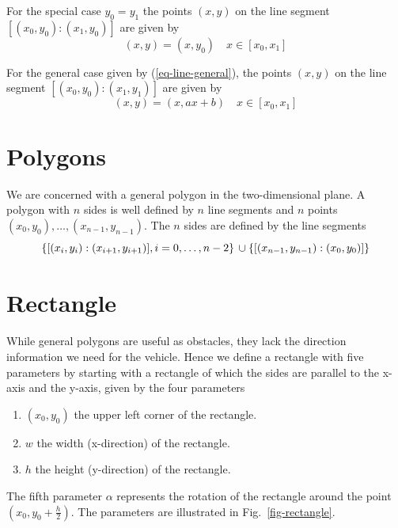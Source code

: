 \documentclass[11pt]{article}
\newcommand{\eqn}[1]{(\ref{#1})}
\newcommand{\figref}[1]{Fig.~\eqref{#1}}
\begin{document}
For the special case $y_0 = y_1$ the points $(x, y)$ on the line segment 
$[(x_0, y_0):(x_1, y_0)]$ are given by
\begin{equation}
    (x, y) = (x, y_0)\quad x\in [x_0, x_1]\label{eq-seg-y1y0}
\end{equation}

For the general case given by \eqn{eq-line-general}, the points $(x, y)$ on 
the line segment $[(x_0, y_0):(x_1, y_1)]$ are given by
\begin{equation}
    (x, y) = (x, ax + b)\quad x\in [x_0, x_1]\label{eq-seg-general}
\end{equation}

\section{Polygons}
\label{sec-polygons}

We are concerned with a general polygon in the two-dimensional plane. A polygon
with $n$ sides is well defined by $n$ line segments and $n$ points $(x_0,
y_0),\ldots,(x_{n-1}, y_{n-1})$. The $n$ sides are defined by the line segments
\begin{equation}
    \left\{[(x_i, y_i):(x_{i+1}, y_{i+1})], i=0,\ldots,n-2\right\}\\
\cup\left\{[(x_{n-1}, y_{n-1}):(x_{0}, y_{0})]\right\}
\end{equation}

\section{Rectangle}
\label{sec-rectangle}
While general polygons are useful as obstacles, they lack the direction 
information we need for the vehicle.  Hence we define a rectangle with five 
parameters by starting with a rectangle of which the sides are parallel to 
the x-axis and the y-axis, given by the four parameters
\begin{enumerate}
    \item $(x_0, y_0)$ the upper left corner of the rectangle.
    \item $w$ the width (x-direction) of the rectangle.
    \item $h$ the height (y-direction) of the rectangle.
\end{enumerate}
The fifth parameter $\alpha$ represents the rotation of the rectangle around
the point $\left(x_0, y_0 + \frac{h}{2}\right)$. The parameters are illustrated
in \figref{fig-rectangle}.
\end{document}
